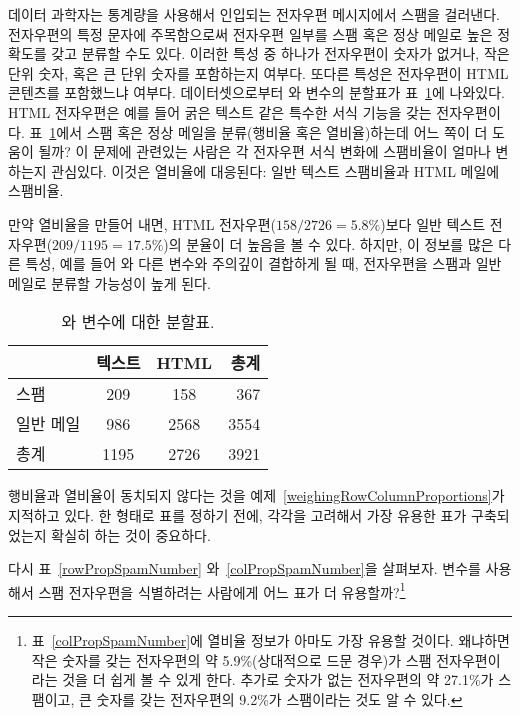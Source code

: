 \begin{example}{
데이터 과학자는 통계량을 사용해서 인입되는 전자우편 메시지에서 스팸을 걸러낸다. 전자우편의 특정 문자에 주목함으로써 전자우편 일부를 스팸 혹은 정상 메일로 높은 정확도를 갖고 분류할 수도 있다. 이러한 특성 중 하나가 전자우편이 숫자가 없거나, 작은 단위 숫자, 혹은 큰 단위 숫자를 포함하는지 여부다. 또다른 특성은 전자우편이 HTML 콘텐츠를 포함했느냐 여부다.  데이터셋으로부터 와  변수의 분할표가 표~\ref{emailSpamHTMLTableTotals}에 나와있다. HTML 전자우편은 예를 들어 굵은 텍스트 같은 특수한 서식 기능을 갖는 전자우편이다. 표~\ref{emailSpamHTMLTableTotals}에서 스팸 혹은 정상 메일을 분류(행비율 혹은 열비율)하는데 어느 쪽이 더 도움이 될까?} \label{weighingRowColumnProportions}
이 문제에 관련있는 사람은 각 전자우편 서식 변화에 스팸비율이 얼마나 변하는지 관심있다. 이것은 열비율에 대응된다: 일반 텍스트 스팸비율과 HTML 메일에 스팸비율.

만약 열비율을 만들어 내면, HTML 전자우편($158/2726 = 5.8\%$)보다 일반 텍스트 전자우편($209/1195 = 17.5\%$)의 분율이 더 높음을 볼 수 있다. 하지만, 이 정보를 많은 다른 특성, 예를 들어 와 다른 변수와 주의깊이 결합하게 될 때, 전자우편을 스팸과 일반메일로 분류할 가능성이 높게 된다. 
\end{example}

\begin{table}[ht]
\centering
\begin{tabular}{l cc r}
  \hline
 & 텍스트 & HTML & 총계 \\ 
  \hline
스팸 & 209 & 158 & 367 \\ 
일반 메일 & 986 & 2568 & 3554 \\ 
   \hline
총계 & 1195 & 2726 & 3921 \\
   \hline
\end{tabular}
\caption{ 와  변수에 대한 분할표.}
\label{emailSpamHTMLTableTotals}
\end{table}

행비율과 열비율이 동치되지 않다는 것을 예제~\ref{weighingRowColumnProportions}가 지적하고 있다. 한 형태로 표를 정하기 전에, 각각을 고려해서 가장 유용한 표가 구축되었는지 확실히 하는 것이 중요하다.

\begin{exercise}
다시 표~\ref{rowPropSpamNumber} 와~\ref{colPropSpamNumber}을 살펴보자.  변수를 사용해서 스팸 전자우편을 식별하려는 사람에게 어느 표가 더 유용할까?\footnote{표~\ref{colPropSpamNumber}에 열비율 정보가 아마도 가장 유용할 것이다. 왜냐하면 작은 숫자를 갖는 전자우편의 약 5.9\%(상대적으로 드문 경우)가 스팸 전자우편이라는 것을 더 쉽게 볼 수 있게 한다. 추가로 숫자가 없는 전자우편의 약 27.1\%가 스팸이고, 큰 숫자를 갖는 전자우편의 9.2\%가 스팸이라는 것도 알 수 있다.}
\end{exercise}


